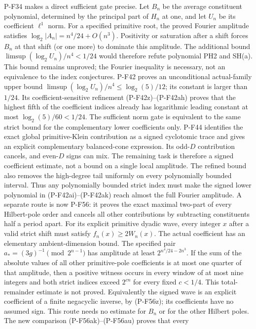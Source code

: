 \begin{description}
P-F34 makes a direct sufficient gate precise. Let $B_n$ be the
average constituent polynomial, determined by the principal part
of $H_n$ at one, and let $U_n$ be its coefficient $\ell^1$ norm.
For a specified primitive root, the proved Fourier amplitude satisfies
$\log_2|A_n|=n^4/24+O(n^3)$. Positivity or saturation
after a shift forces $B_n$ at that shift (or one more) to dominate
this amplitude. The additional bound
$\limsup (\log_2 U_n)/n^4<1/24$ would therefore refute polynomial
PH2 and SH(a). This bound remains unproved; the Fourier inequality
is necessary, not an equivalence to the index conjectures.
P-F42 proves an unconditional actual-family upper bound
$\limsup(\log_2 U_n)/n^4\le\log_2(5)/12$; its constant
is larger than $1/24$. Its coefficient-sensitive refinement
(P-F42z)--(P-F42ah) proves that the highest fifth of the
coefficient indices already has logarithmic leading constant
at most $\log_2(5)/60<1/24$. The sufficient norm gate is
equivalent to the same strict bound for the complementary
lower coefficients only. P-F44 identifies the exact global
primitive-Klein contribution as a signed cyclotomic trace and
gives an explicit complementary balanced-cone expression.
Its odd-$D$ contribution cancels, and even-$D$ signs can mix.
The remaining task is therefore a signed coefficient estimate,
not a bound on a single local amplitude.
The refined bound also removes the high-degree tail uniformly
on every polynomially bounded interval. Thus any polynomially
bounded strict index must make the signed lower polynomial in
(P-F42ai)--(P-F42ak) reach almost the full Fourier amplitude.
A separate route is now P-F56: it proves the exact
maximal two-part of every Hilbert-pole order and cancels all other
contributions by subtracting constituents half a period apart.
For its explicit primitive dyadic wave, every integer $x$ after a
valid strict shift must satisfy $f_n(x)\ge2W_n(x)$.
The actual coefficient has an elementary ambient-dimension bound.
The specified pair $a_*=(3g)^{-1}\pmod{2^{n-1}}$ has amplitude
at least $2^{n^4/24-2n^3}$. If the sum of the absolute values of
all other primitive-pole coefficients is at most one quarter of
that amplitude, then a positive witness occurs in every window
of at most nine integers and both strict indices exceed
$2^{cn}$ for every fixed $c<1/4$. This total-remainder estimate
is not proved. Equivalently the signed wave is an explicit
coefficient of a finite negacyclic inverse, by (P-F56z);
its coefficients have no assumed sign. This route needs no
estimate for $B_n$ or for the other Hilbert poles.
The new comparison (P-F56ak)--(P-F56au) proves that every

\end{description}
